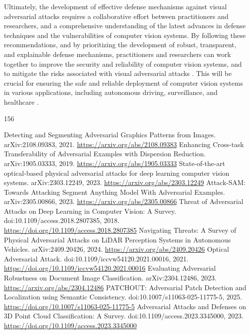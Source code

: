 \documentclass[11pt]{article}
\begin{document}
Ultimately, the development of effective defense mechanisms against visual adversarial attacks requires a collaborative effort between practitioners and researchers, and a comprehensive understanding of the latest advances in defense techniques and the vulnerabilities of computer vision systems. By following these recommendations, and by prioritizing the development of robust, transparent, and explainable defense mechanisms, practitioners and researchers can work together to improve the security and reliability of computer vision systems, and to mitigate the risks associated with visual adversarial attacks \cite{ref13}. This will be crucial for ensuring the safe and reliable deployment of computer vision systems in various applications, including autonomous driving, surveillance, and healthcare \cite{ref3}.


\begin{thebibliography}{156}
 Detecting and Segmenting Adversarial Graphics Patterns from Images. arXiv:2108.09383, 2021. \url{https://arxiv.org/abs/2108.09383}
 Enhancing Cross-task Transferability of Adversarial Examples with Dispersion Reduction. arXiv:1905.03333, 2019. \url{https://arxiv.org/abs/1905.03333}
 State-of-the-art optical-based physical adversarial attacks for deep learning computer vision systems. arXiv:2303.12249, 2023. \url{https://arxiv.org/abs/2303.12249}
 Attack-SAM: Towards Attacking Segment Anything Model With Adversarial Examples. arXiv:2305.00866, 2023. \url{https://arxiv.org/abs/2305.00866}
 Threat of Adversarial Attacks on Deep Learning in Computer Vision: A Survey. doi:10.1109/access.2018.2807385, 2018. \url{https://doi.org/10.1109/access.2018.2807385}
 Navigating Threats: A Survey of Physical Adversarial Attacks on LiDAR Perception Systems in Autonomous Vehicles. arXiv:2409.20426, 2024. \url{https://arxiv.org/abs/2409.20426}
 Optical Adversarial Attack. doi:10.1109/iccvw54120.2021.00016, 2021. \url{https://doi.org/10.1109/iccvw54120.2021.00016}
 Evaluating Adversarial Robustness on Document Image Classification. arXiv:2304.12486, 2023. \url{https://arxiv.org/abs/2304.12486}
 PATCHOUT: Adversarial Patch Detection and Localization using Semantic Consistency. doi:10.1007/s11063-025-11775-5, 2025. \url{https://doi.org/10.1007/s11063-025-11775-5}
 Adversarial Attacks and Defenses on 3D Point Cloud Classification: A Survey. doi:10.1109/access.2023.3345000, 2023. \url{https://doi.org/10.1109/access.2023.3345000}

\end{thebibliography}
\end{document}
